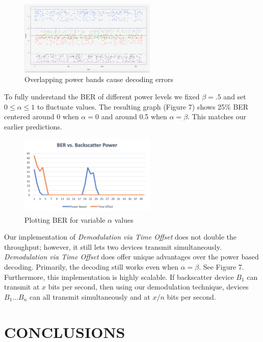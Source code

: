 \documentclass[letterpaper, 10 pt, conference]{IEEEconf}
\begin{document}
\begin{figure}[h!]
  \centerline{\includegraphics[width=65mm,scale=0.50]{Figure_6.png}}
  \caption{Overlapping power bands cause decoding errors}
\end{figure}

To fully understand the BER of different power levels we fixed $\beta = .5$ and set $0 \leq \alpha \leq 1$ to fluctuate values. The resulting graph (Figure 7) shows 25\% BER centered around 0 when $\alpha = 0$ and around 0.5 when $\alpha = \beta$. This matches our earlier predictions. 

\begin{figure}[h!]
  \centerline{\includegraphics[width=65mm,scale=0.50]{Figure_7.png}}
  \caption{Plotting BER for variable $\alpha$ values}
\end{figure}

Our implementation of \textit{Demodulation via Time Offset} does not double the throughput; however, it still lets two devices transmit simultaneously. 
 \textit{Demodulation via Time Offset} does offer unique advantages over the power based decoding. Primarily, the decoding still works even when $\alpha = \beta$. See Figure 7. Furthermore, this implementation is highly scalable. If backscatter device $B_1$ can transmit at $x$ bits per second, then using our demodulation technique, devices $B_1 \ldots B_n$ can all transmit simultaneously and at $x / n$ bits per second. 

\section{CONCLUSIONS}





{}

\end{document}
